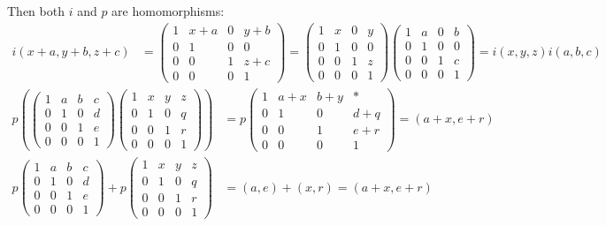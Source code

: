 \documentclass[12pt]{article}
\begin{document}
        Then both $i$ and $p$ are homomorphisms:
        \begin{align*}
            i(x+a, y+b, z+c) &= \begin{pmatrix}
                1 & x+a & 0 & y+b\\ 
                0 & 1 & 0 & 0\\
                0 & 0 & 1 & z+c\\
                0 & 0 & 0 & 1
            \end{pmatrix} = \begin{pmatrix}
                1 & x & 0 & y\\ 
                0 & 1 & 0 & 0\\
                0 & 0 & 1 & z\\
                0 & 0 & 0 & 1
            \end{pmatrix} \begin{pmatrix}
            1 & a & 0 & b\\ 
            0 & 1 & 0 & 0\\
            0 & 0 & 1 & c\\
            0 & 0 & 0 & 1
        \end{pmatrix} = i(x, y,z)i(a, b, c)
    \end{align*}
    \begin{align*}
        p\left(\begin{pmatrix}
            1 & a & b & c\\ 
            0 & 1 & 0 & d\\
            0 & 0 & 1 & e\\
            0 & 0 & 0 & 1
        \end{pmatrix}\begin{pmatrix}
            1 & x & y & z\\ 
            0 & 1 & 0 & q\\
            0 & 0 & 1 & r\\
            0 & 0 & 0 & 1
        \end{pmatrix}\right) &= p\begin{pmatrix}
            1 & a + x & b + y & *\\ 
            0 & 1 & 0 & d + q\\ 
            0 & 0 & 1 & e + r\\ 
            0 & 0 & 0 & 1
        \end{pmatrix} = (a+x, e+r)\\ 
        p\begin{pmatrix}
            1 & a & b & c\\ 
            0 & 1 & 0 & d\\
            0 & 0 & 1 & e\\
            0 & 0 & 0 & 1
        \end{pmatrix} + p\begin{pmatrix}
            1 & x & y & z\\ 
            0 & 1 & 0 & q\\
            0 & 0 & 1 & r\\
            0 & 0 & 0 & 1
        \end{pmatrix} &= (a, e) + (x, r) = (a + x, e + r)
        \end{align*}
\end{document}
